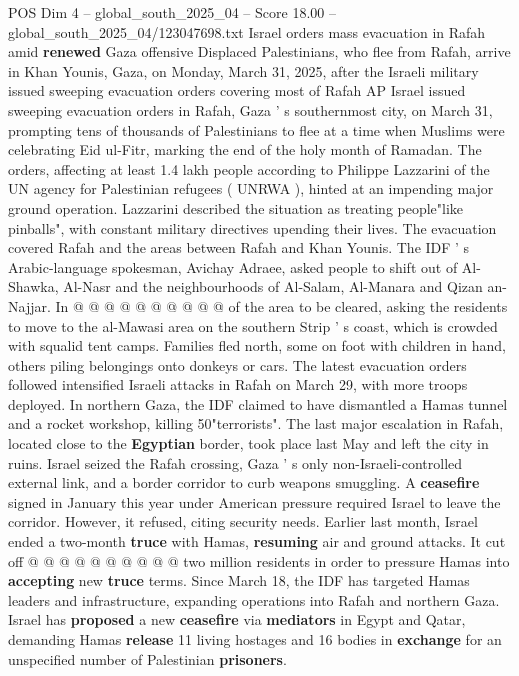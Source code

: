 \begin{textsample}{POS Dim 4 – global\_south\_2025\_04 – Score 18.00 – global\_south\_2025\_04/123047698.txt}  \label{ex:f4_pos_250}
Israel orders mass evacuation in Rafah amid \textbf{renewed} Gaza offensive Displaced Palestinians, who flee from Rafah, arrive in Khan Younis, Gaza, on Monday, March 31, 2025, after the Israeli military issued sweeping evacuation orders covering most of Rafah AP Israel issued sweeping evacuation orders in Rafah, Gaza ' s southernmost city, on March 31, prompting tens of thousands of Palestinians to flee at a time when Muslims were celebrating Eid ul-Fitr, marking the end of the holy month of Ramadan.
The orders, affecting at least 1.4 lakh people according to Philippe Lazzarini of the UN agency for Palestinian refugees ( UNRWA ), hinted at an impending major ground operation.
Lazzarini described the situation as treating people"like pinballs", with constant military directives upending their lives.
The evacuation covered Rafah and the areas between Rafah and Khan Younis.
The IDF ' s Arabic-language spokesman, Avichay Adraee, asked people to shift out of Al-Shawka, Al-Nasr and the neighbourhoods of Al-Salam, Al-Manara and Qizan an-Najjar.
In @ @ @ @ @ @ @ @ @ @ of the area to be cleared, asking the residents to move to the al-Mawasi area on the southern Strip ' s coast, which is crowded with squalid tent camps.
Families fled north, some on foot with children in hand, others piling belongings onto donkeys or cars.
The latest evacuation orders followed intensified Israeli attacks in Rafah on March 29, with more troops deployed.
In northern Gaza, the IDF claimed to have dismantled a Hamas tunnel and a rocket workshop, killing 50"terrorists".
The last major escalation in Rafah, located close to the \textbf{Egyptian} border, took place last May and left the city in ruins.
Israel seized the Rafah crossing, Gaza ' s only non-Israeli-controlled external link, and a border corridor to curb weapons smuggling.
A \textbf{ceasefire} signed in January this year under American pressure required Israel to leave the corridor.
However, it refused, citing security needs.
Earlier last month, Israel ended a two-month \textbf{truce} with Hamas, \textbf{resuming} air and ground attacks.
It cut off @ @ @ @ @ @ @ @ @ @ two million residents in order to pressure Hamas into \textbf{accepting} new \textbf{truce} terms.
Since March 18, the IDF has targeted Hamas leaders and infrastructure, expanding operations into Rafah and northern Gaza.
Israel has \textbf{proposed} a new \textbf{ceasefire} via \textbf{mediators} in Egypt and Qatar, demanding Hamas \textbf{release} 11 living hostages and 16 bodies in \textbf{exchange} for an unspecified number of Palestinian \textbf{prisoners}.

\end{textsample}

